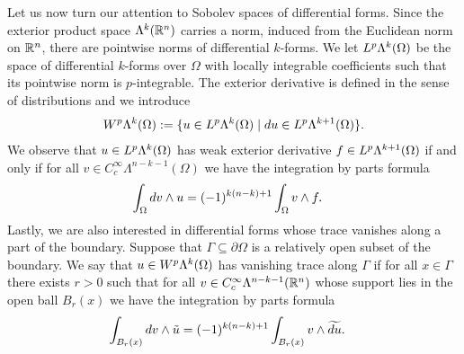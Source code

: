 \documentclass[10pt,a4paper]{article}
\newcommand{\todo}[1]{{\colorbox{yellow}{#1}}}
\newcommand\cye[1]{%
\protect\leavevmode
\begingroup
    \color{blue}%
    #1%
\endgroup
}
\newcommand{\mwl}[1]{{\color{red}#1}}
\begin{document}
Let us now turn our attention to Sobolev spaces of differential forms. 
Since the exterior product space $\Lambda^{k}({\mathbb R}^{n})$ carries a norm, induced from the Euclidean norm on ${\mathbb R}^{n}$, there are pointwise norms of differential $k$-forms. 
We let $L^{p}\Lambda^{k}(\Omega)$ be the space of differential $k$-forms over $\Omega$ with locally integrable coefficients 
such that its pointwise norm is $p$-integrable. 
The exterior derivative is defined in the sense of distributions and we introduce 
\begin{gather*}
    W^{p}\Alt^{k}(\Omega) 
    := 
    \{ u \in L^{p}\Alt^{k}(\Omega) \suchthat \cartan u \in L^{p}\Alt^{k+1}(\Omega) \}
    .
\end{gather*}
We observe that $u \in L^{p}\Lambda^{k}(\Omega)$ has weak exterior derivative $f \in L^{p}\Lambda^{k+1}(\Omega)$
if and only if for all $v \in C^{\infty}_{c}\Lambda^{n-k-1}(\Omega)$ we have the integration by parts formula
\begin{align*}
    \int_{\Omega} d v \wedge u
    &=
    (-1)^{k(n-k)+1}
    \int_{\Omega} v \wedge f 
    .
\end{align*}
Lastly, we are also interested in differential forms whose trace vanishes along a part of the boundary. 
Suppose that $\Gamma \subseteq \partial\Omega$ is a relatively open subset of the boundary. 
We say that $u \in W^{p}\Lambda^{k}(\Omega)$ has vanishing trace along $\Gamma$ if for all $x \in \Gamma$ there exists $r > 0$
such that for all $v \in C^{\infty}_{c}\Lambda^{n-k-1}({\mathbb R}^{n})$ 
whose support lies in the open ball $B_r(x)$
we have the integration by parts formula
\begin{align*}
    \int_{B_r(x)} d v \wedge \tilde u
    &=
    (-1)^{k(n-k)+1}
    \int_{B_r(x)} v \wedge \widetilde{d u}
    .
\end{align*}
\end{document}
